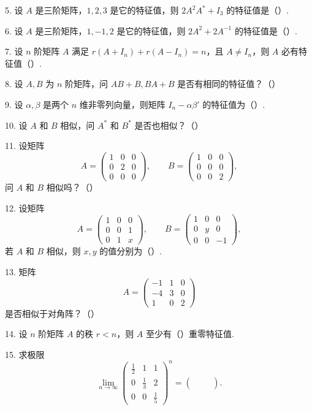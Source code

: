 \documentclass[UTF8, 12pt, fontset=fandol, oneside]{ctexart}
\begin{document}
5. 设 $A$ 是三阶矩阵，$1,2,3$ 是它的特征值，则 $2A^2A^*+I_3$ 的特征值是（\quad ）.

6. 设 $A$ 是三阶矩阵，$1,-1,2$ 是它的特征值，则 $2A^2+2A^{-1}$ 的特征值是（\quad ）.

7. 设 $n$ 阶矩阵 $A$ 满足 $r(A+I_n)+r(A-I_n)=n$，且 $A\ne I_n$，则 $A$ 必有特征值（\quad ）.

8. 设 $A,B$ 为 $n$ 阶矩阵，问 $AB+B,BA+B$ 是否有相同的特征值？（\quad ）

9. 设 $\alpha,\beta$ 是两个 $n$ 维非零列向量，则矩阵 $I_n-\alpha\beta'$ 的特征值为（\quad ）.

10. 设 $A$ 和 $B$ 相似，问 $A^*$ 和 $B^*$ 是否也相似？（\quad ）

11. 设矩阵
\[
A=\begin{pmatrix}1&0&0\\0&2&0\\0&0&0\end{pmatrix},\qquad
B=\begin{pmatrix}1&0&0\\0&0&0\\0&0&2\end{pmatrix},
\]
问 $A$ 和 $B$ 相似吗？（\quad ）

12. 设矩阵
\[
A=\begin{pmatrix}1&0&0\\0&0&1\\0&1&x\end{pmatrix},\qquad
B=\begin{pmatrix}1&0&0\\0&y&0\\0&0&-1\end{pmatrix},
\]
若 $A$ 和 $B$ 相似，则 $x,y$ 的值分别为（\quad ）.

13. 矩阵
\[
A=\begin{pmatrix}-1&1&0\\-4&3&0\\1&0&2\end{pmatrix}
\]
是否相似于对角阵？（\quad ）

14. 设 $n$ 阶矩阵 $A$ 的秩 $r<n$，则 $A$ 至少有（\quad ）重零特征值.

15. 求极限
\[
\lim_{n\to\infty}
\begin{pmatrix}
\frac12&1&1\\
0&\frac13&2\\
0&0&\frac15
\end{pmatrix}^n
=
\begin{pmatrix}
&&\\
&&\\
&&
\end{pmatrix}.
\]
\end{document}
